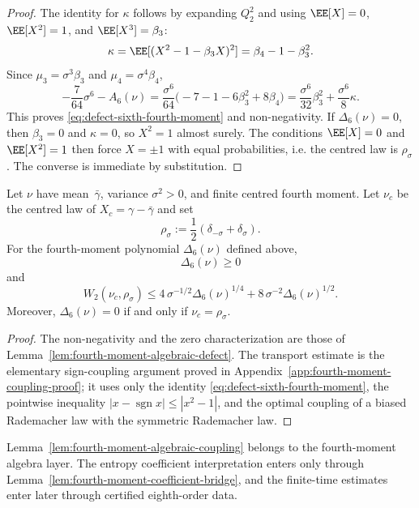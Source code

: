 \begin{proof}
The identity for $\kappa$ follows by expanding $Q_2^2$ and using
$\EE[X]=0$, $\EE[X^2]=1$, and $\EE[X^3]=\beta_3$:
\[
\kappa
=\EE[(X^2-1-\beta_3X)^2]
=\beta_4-1-\beta_3^2.
\]
Since $\mu_3=\sigma^3\beta_3$ and $\mu_4=\sigma^4\beta_4$,
\[
-\frac{7}{64}\sigma^6-A_6(\nu)
=\frac{\sigma^6}{64}\bigl(-7-1-6\beta_3^2+8\beta_4\bigr)
=\frac{\sigma^6}{32}\beta_3^2+\frac{\sigma^6}{8}\kappa.
\]
This proves \eqref{eq:defect-sixth-fourth-moment} and non-negativity.  If
\(\Delta_6(\nu)=0\), then $\beta_3=0$ and $\kappa=0$, so
$X^2=1$ almost surely.  The conditions $\EE[X]=0$ and $\EE[X^2]=1$ then
force $X=\pm1$ with equal probabilities, i.e. the centred law is
$\rho_\sigma$.  The converse is immediate by substitution.
\end{proof}

\begin{lemma}%
\label{lem:fourth-moment-algebraic-coupling}
Let $\nu$ have mean~$\bar{\gamma}$, variance $\sigma^2>0$, and finite
centred fourth moment.  Let $\nu_c$ be the centred law of
$X_c=\gamma-\bar{\gamma}$ and set
\[
\rho_\sigma:=\frac12(\delta_{-\sigma}+\delta_\sigma).
\]
For the fourth-moment polynomial $\Delta_6(\nu)$ defined above,
\[
\Delta_6(\nu)\ge0
\]
and
\begin{equation}\label{eq:fourth-moment-algebraic-coupling}
W_2(\nu_c,\rho_\sigma)
\le
4\,\sigma^{-1/2}\Delta_6(\nu)^{1/4}
+8\,\sigma^{-2}\Delta_6(\nu)^{1/2}.
\end{equation}
Moreover, $\Delta_6(\nu)=0$ if and only if
$\nu_c=\rho_\sigma$.
\end{lemma}

\begin{proof}
The non-negativity and the zero characterization are those of
Lemma~\ref{lem:fourth-moment-algebraic-defect}.  The transport estimate is
the elementary sign-coupling argument proved in
Appendix~\ref{app:fourth-moment-coupling-proof}; it uses only the identity
\eqref{eq:defect-sixth-fourth-moment}, the pointwise inequality
\(|x-\operatorname{sgn}x|\le |x^2-1|\), and the optimal coupling of a biased
Rademacher law with the symmetric Rademacher law.
\end{proof}

\begin{remark}
Lemma~\ref{lem:fourth-moment-algebraic-coupling} belongs to the
fourth-moment algebra layer.  The entropy coefficient interpretation enters
only through Lemma~\ref{lem:fourth-moment-coefficient-bridge}, and the finite-time
estimates enter later through certified eighth-order data.
\end{remark}

